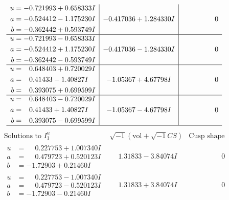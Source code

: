 \documentclass[1p]{elsarticle_modified}
\theoremstyle{definition}
\newcommand{\I}{\sqrt{-1}}
\begin{document}
$$\begin{array}{c|c|c}
\begin{aligned}
u &= -0.721993 + 0.658333 I \\
a &= -0.524412 - 1.175230 I \\
b &= -0.362442 + 0.593749 I\end{aligned}
 & -0.417036 + 1.284330 I & \phantom{-0.000000 } 0 \\ \hline\begin{aligned}
u &= -0.721993 - 0.658333 I \\
a &= -0.524412 + 1.175230 I \\
b &= -0.362442 - 0.593749 I\end{aligned}
 & -0.417036 - 1.284330 I & \phantom{-0.000000 } 0 \\ \hline\begin{aligned}
u &= \phantom{-}0.648403 + 0.720029 I \\
a &= \phantom{-}0.41433 - 1.40827 I \\
b &= \phantom{-}0.393075 + 0.699599 I\end{aligned}
 & -1.05367 + 4.67798 I & \phantom{-0.000000 } 0 \\ \hline\begin{aligned}
u &= \phantom{-}0.648403 - 0.720029 I \\
a &= \phantom{-}0.41433 + 1.40827 I \\
b &= \phantom{-}0.393075 - 0.699599 I\end{aligned}
 & -1.05367 - 4.67798 I & \phantom{-0.000000 } 0\\
 \hline 
 \end{array}$$\newpage$$\begin{array}{c|c|c}  
\text{Solutions to }I^u_{1}& \I (\text{vol} + \sqrt{-1}CS) & \text{Cusp shape}\\
 \hline 
\begin{aligned}
u &= \phantom{-}0.227753 + 1.007340 I \\
a &= \phantom{-}0.479723 + 0.520123 I \\
b &= -1.72903 + 0.21460 I\end{aligned}
 & \phantom{-}1.31833 - 3.84074 I & \phantom{-0.000000 } 0 \\ \hline\begin{aligned}
u &= \phantom{-}0.227753 - 1.007340 I \\
a &= \phantom{-}0.479723 - 0.520123 I \\
b &= -1.72903 - 0.21460 I\end{aligned}
 & \phantom{-}1.31833 + 3.84074 I & \phantom{-0.000000 } 0 \\ \hline\begin{aligned}

\end{aligned}
\end{array}$$
\end{document}
